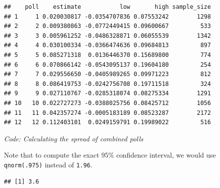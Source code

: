 \documentclass[
]{article}
\newenvironment{Shaded}{\begin{snugshade}}{\end{snugshade}}
\newcommand{\DataTypeTok}[1]{\textcolor[rgb]{0.13,0.29,0.53}{#1}}
\newcommand{\DecValTok}[1]{\textcolor[rgb]{0.00,0.00,0.81}{#1}}
\newcommand{\FloatTok}[1]{\textcolor[rgb]{0.00,0.00,0.81}{#1}}
\newcommand{\KeywordTok}[1]{\textcolor[rgb]{0.13,0.29,0.53}{\textbf{#1}}}
\newcommand{\NormalTok}[1]{#1}
\newcommand{\OperatorTok}[1]{\textcolor[rgb]{0.81,0.36,0.00}{\textbf{#1}}}
\newcommand{\StringTok}[1]{\textcolor[rgb]{0.31,0.60,0.02}{#1}}
\begin{document}
\begin{verbatim}
##    poll    estimate           low       high sample_size
## 1     1 0.020030817 -0.0354707836 0.07553242        1298
## 2     2 0.009380863 -0.0772449415 0.09600667         533
## 3     3 0.005961252 -0.0486328871 0.06055539        1342
## 4     4 0.030100334 -0.0366474636 0.09684813         897
## 5     5 0.085271318  0.0136446370 0.15689800         774
## 6     6 0.070866142 -0.0543095137 0.19604180         254
## 7     7 0.029556650 -0.0405989265 0.09971223         812
## 8     8 0.086419753 -0.0242756708 0.19711518         324
## 9     9 0.027110767 -0.0285318074 0.08275334        1291
## 10   10 0.022727273 -0.0388025756 0.08425712        1056
## 11   11 0.042357274 -0.0005183189 0.08523287        2172
## 12   12 0.112403101  0.0249159791 0.19989022         516
\end{verbatim}

\emph{Code: Calculating the spread of combined polls}

Note that to compute the exact 95\% confidence interval, we would use
\texttt{qnorm(.975)} instead of \texttt{1.96}.

\begin{Shaded}
\end{Shaded}

\begin{verbatim}
## [1] 3.6
\end{verbatim}
\end{document}
